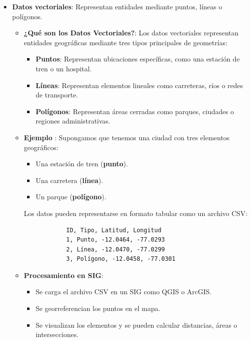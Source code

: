 \documentclass{article}
\begin{document}
\begin{itemize}
	\setlength{\itemsep}{-0pt}  %
	\setlength{\leftmargini}{0pt}  %
	\item \textbf{Datos vectoriales}: Representan entidades mediante puntos, líneas o polígonos.
	\begin{itemize}
		\setlength{\leftmargini}{1em} %
		\item \textbf{¿Qué son los Datos Vectoriales?}: Los datos vectoriales representan entidades geográficas mediante tres tipos principales de geometrías:
		\begin{itemize}
			\setlength{\leftmargini}{2em} %
			\item \small \textbf{Puntos}: Representan ubicaciones específicas, como una estación de tren o un hospital.
			\item \textbf{Líneas}: Representan elementos lineales como carreteras, ríos o redes de transporte.
			\item \textbf{Polígonos}: Representan áreas cerradas como parques, ciudades o regiones administrativas.
		\end{itemize}
		
		\item \textbf{Ejemplo }: Supongamos que tenemos una ciudad con tres elementos geográficos:
		\begin{itemize}
			\item Una estación de tren (\textbf{punto}).
			\item Una carretera (\textbf{línea}).
			\item Un parque (\textbf{polígono}).
		\end{itemize}
		
		Los datos pueden representarse en formato tabular como un archivo CSV:
		\begin{verbatim}
			ID, Tipo, Latitud, Longitud
			1, Punto, -12.0464, -77.0293
			2, Línea, -12.0470, -77.0299
			3, Polígono, -12.0458, -77.0301
		\end{verbatim}
		
		\item \textbf{Procesamiento en SIG}: 
		\begin{itemize}
			\item Se carga el archivo CSV en un SIG como QGIS o ArcGIS.
			\item Se georreferencian los puntos en el mapa.
			\item Se visualizan los elementos y se pueden calcular distancias, áreas o intersecciones.
		\end{itemize}
		

\end{itemize}
\end{itemize}
\end{document}
